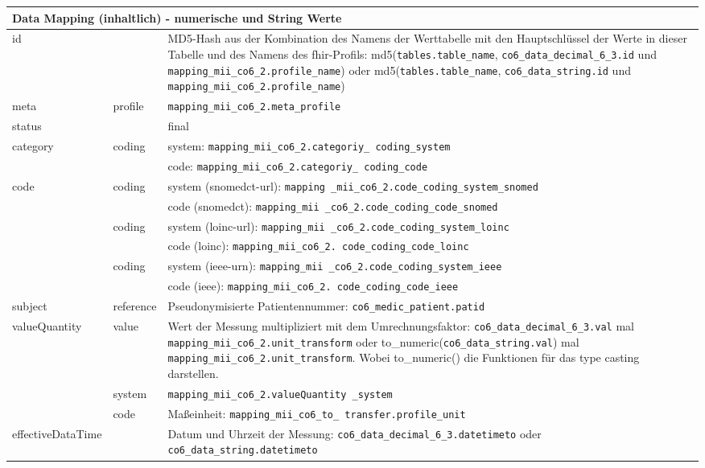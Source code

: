 \begin{longtable}{|l|l|p{7.5cm}|} 
	\hline
	\multicolumn{3}{|l|}{\bfseries Data Mapping (inhaltlich) - numerische und String Werte} \\ \hline
	id &  & MD5-Hash aus der Kombination des Namens der Werttabelle mit den Hauptschlüssel der Werte in dieser Tabelle und des Namens des \ac{fhir}-Profils: md5(\texttt{tables.table\_name}, \texttt{co6\_data\_decimal\_6\_3.id} und \texttt{mapping\_mii\_co6\_2.profile\_name}) oder md5(\texttt{tables.table\_name}, \texttt{co6\_data\_string.id} und \texttt{mapping\_mii\_co6\_2.profile\_name}) \\ \hline
	meta & profile & \texttt{mapping\_mii\_co6\_2.meta\_profile} \\ \hline 
	status &  & final  \\ \hline 
	category & coding & system: \texttt{mapping\_mii\_co6\_2.categoriy\_ coding\_system} \\ 
	\cline{3-3}
	& & code: \texttt{mapping\_mii\_co6\_2.categoriy\_ coding\_code} \\ \hline
	code & coding & system (\ac{snomedct}-\acs{url}): \texttt{mapping \_mii\_co6\_2.code\_coding\_system\_snomed} \\ 
	\cline{3-3} 
	 &   & code (\ac{snomedct}): \texttt{mapping\_mii \_co6\_2.code\_coding\_code\_snomed} \\
	 \cline{2-3} 
	 &  coding & system (\ac{loinc}-\ac{url}): \texttt{mapping\_mii \_co6\_2.code\_coding\_system\_loinc} \\ 
	 \cline{3-3} 
	  &  & code (\ac{loinc}): \texttt{mapping\_mii\_co6\_2. code\_coding\_code\_loinc} \\ 
	 \cline{2-3} 
	  & coding & system (\ac{ieee}-\acs{urn}): \texttt{mapping\_mii \_co6\_2.code\_coding\_system\_ieee} \\ 
	 \cline{3-3} 
	 &  & code (\ac{ieee}): \texttt{mapping\_mii\_co6\_2. code\_coding\_code\_ieee} \\ \hline
	subject & reference & Pseudonymisierte Patientennummer: \texttt{co6\_medic\_patient.patid} \\ \hline
	valueQuantity & value & Wert der Messung multipliziert mit dem Umrechnungsfaktor: \texttt{co6\_data\_decimal\_6\_3.val} mal \texttt{mapping\_mii\_co6\_2.unit\_transform} oder to\_numeric(\texttt{co6\_data\_string.val}) mal \texttt{mapping\_mii\_co6\_2.unit\_transform}. Wobei to\_numeric() die Funktionen für das type casting darstellen.\\
	 \cline{2-3}
	 & system & \texttt{mapping\_mii\_co6\_2.valueQuantity \_system} \\ 
	 \cline{2-3}
	 & code & Maßeinheit: \texttt{mapping\_mii\_co6\_to\_ transfer.profile\_unit}\\ \hline
    effectiveDataTime & & Datum und Uhrzeit der Messung: \texttt{co6\_data\_decimal\_6\_3.datetimeto} oder \texttt{co6\_data\_string.datetimeto} \\  \hline
\end{longtable}


